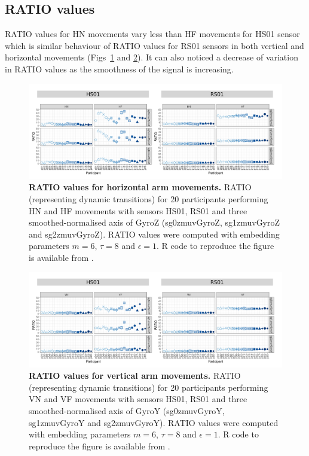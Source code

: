 






\subsection{RATIO values}
RATIO values for HN movements vary less than HF movements for HS01 sensor 
which is similar behaviour of RATIO values for RS01 sensors 
in both vertical and horizontal movements (Figs~\ref{fig:ratio_aH} and \ref{fig:ratio_aV}).
It can also noticed a decrease of variation in RATIO values as the smoothness of the signal is increasing.
\begin{figure}[!h]
\centering
\includegraphics[width=1.0\textwidth]{ratio_aH}
    \caption{
	{\bf RATIO values for horizontal arm movements.}
	RATIO (representing dynamic transitions) for 
	20 participants performing HN and HF movements
	with sensors HS01, RS01 and three smoothed-normalised axis 
	of GyroZ (sg0zmuvGyroZ, sg1zmuvGyroZ and sg2zmuvGyroZ).
	RATIO values were computed with 
	embedding parameters $m=6$, $\tau=8$ and $\epsilon=1$.
	R code to reproduce the figure is available from \cite{hwum2018}.
        }
    \label{fig:ratio_aH}
\end{figure}
\begin{figure}[!h]
\centering
\includegraphics[width=1.0\textwidth]{ratio_aV}
    \caption{
	{\bf RATIO values for vertical arm movements.}
	RATIO (representing dynamic transitions) for 
	20 participants performing VN and VF movements
	with sensors HS01, RS01 and three smoothed-normalised axis 
	of GyroY (sg0zmuvGyroY, sg1zmuvGyroY and sg2zmuvGyroY).
	RATIO values were computed with
	embedding parameters $m=6$, $\tau=8$ and $\epsilon=1$.
	R code to reproduce the figure is available from \cite{hwum2018}.
        }
    \label{fig:ratio_aV}
\end{figure}
